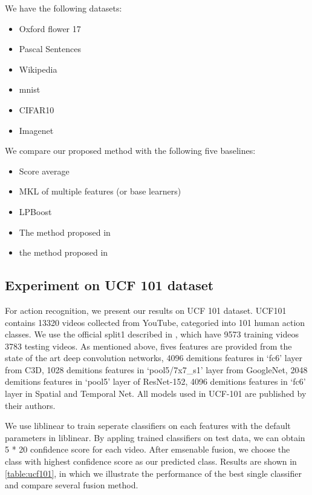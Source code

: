 \documentclass[letterpaper]{article}
\begin{document}
We have the following datasets:
\begin{itemize}
  \item Oxford flower 17
  \item Pascal Sentences
  \item Wikipedia
  \item mnist
  \item CIFAR10
  \item Imagenet
\end{itemize}
We compare our proposed method with the following five baselines:
\begin{itemize}
  \item Score average
  \item MKL of multiple features (or base learners)
  \item LPBoost
  \item The method proposed in~\cite{gaoijcai2016robust}
  \item the method proposed in~\cite{xuiccv2013feature}
\end{itemize}

\fi

\subsection{Experiment on UCF 101 dataset}
For action recognition, we present our results on UCF 101 dataset\cite{soomro2012ucf101}. UCF101 contains 13320 videos collected from YouTube, categoried into 101 human action classes. We use the official split1 described in \cite{soomro2012ucf101}, which have 9573 training videos 3783 testing videos. As mentioned above, fives features are provided from the state of the art deep convolution networks, 4096 demitions features in `fc6' layer from C3D, 1028 demitions features in `pool5/7x7\_s1' layer from  GoogleNet, 2048 demitions features in `pool5' layer of ResNet-152, 4096 demitions features in `fc6' layer in Spatial and Temporal Net. All models used in UCF-101 are published by their authors.

We use liblinear to train seperate classifiers on each features with the default parameters in liblinear. By appling trained classifiers on test data, we can obtain 5 * 20 confidence score for each video. After emsenable fusion, we choose the class with highest confidence score as our predicted class. Results are shown in \ref{table:ucf101}, in which we illustrate the performance of the best single classifier and compare several fusion method.
\end{document}
